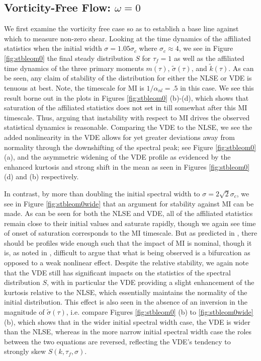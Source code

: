 \documentclass[a4paper,11pt]{article}
\begin{document}
\subsection*{Vorticity-Free Flow: $\omega = 0$}

We first examine the vorticity free case so as to establish a base line against which to measure non-zero shear.  Looking at the time dynamics of the affiliated statistics when the initial width $\sigma=1.05\sigma_{c}$ where $\sigma_{c}\approx 4$, we see in Figure \ref{fig:stbleom0} the final steady distribution $S$ for $\tau_{f}=1$ as well as the affiliated time dynamics of the three primary moments $m(\tau)$, $\tilde{\sigma}(\tau)$, and $\tilde{k}(\tau)$.  As can be seen, any claim of stability of the distribution for either the NLSE or VDE is tenuous at best.  Note, the timescale for MI is $1/\alpha_{nl} = .5$ in this case.  We see this result borne out in the plots in Figures \ref{fig:stbleom0} (b)-(d), which shows that saturation of the affiliated statistics does not set in till somewhat after this MI timescale.  Thus, arguing that instability with respect to MI drives the observed statistical dynamics is reasonable.  Comparing the VDE to the NLSE, we see the added nonlinearity in the VDE allows for yet greater deviations away from normality through the downshifting of the spectral peak; see Figure \ref{fig:stbleom0} (a), and the asymmetric widening of the VDE profile as evidenced by the enhanced kurtosis and strong shift in the mean as seen in Figures \ref{fig:stbleom0} (d) and (b) respectively.  

In contrast, by more than doubling the initial spectral width to $\sigma = 2\sqrt{2}\sigma_{c}$, we see in Figure \ref{fig:stbleom0wide} that an argument for stability against MI can be made.  As can be seen for both the NLSE and VDE, all of the affiliated statistics remain close to their initial values and saturate rapidly, though we again see time of onset of saturation corresponds to the MI timescale.  But as predicted in \cite{alber}, there should be profiles wide enough such that the impact of MI is nominal, though it is, as noted in \cite{janssen}, difficult to argue that what is being observed is a bifurcation as opposed to a weak nonlinear effect.   Despite the relative stability, we again note that the VDE still has significant impacts on the statistics of the spectral distribution $S$, with in particular the VDE providing a slight enhancement of the kurtosis relative to the NLSE, which essentially maintains the normality of the initial distribution.  This effect is also seen in the absence of an inversion in the magnitude of $\tilde{\sigma}(\tau)$, i.e. compare Figures \ref{fig:stbleom0} (b) to \ref{fig:stbleom0wide} (b), which shows that in the wider initial spectral width case, the VDE is wider than the NLSE, whereas in the more narrow initial spectral width case the roles between the two equations are reversed, reflecting the VDE's tendency to strongly skew $S(k,\tau_{f},\sigma)$.
\end{document}
